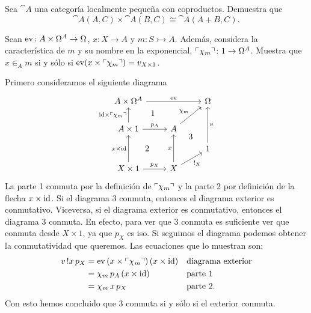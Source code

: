 \begin{exercise}[par=2]
  Sea \(\cat{A}\) una categoría localmente pequeña con coproductos. Demuestra que
  \begin{equation*}
    \cat{A}(A,C)\times\cat{A}(B,C)\cong\cat{A}(A+B,C).
  \end{equation*}
\end{exercise}

\begin{exercise}[par=2,teca=2]
  Sean \(\mathrm{ev}\colon A\times\Omega^A\to\Omega\), \(x\colon X\to A\) y 
  \(m\colon S\rightarrowtail A\). Además, considera la característica de \(m\) y
  su nombre en la exponencial, \(\ulcorner\chi_m\urcorner\colon 1\to\Omega^A\). Muestra que 
  \(x\in_A m\) si y sólo si \(\mathrm{ev}(x\times\ulcorner\chi_m\urcorner) = v_{X\times 1}\).
\end{exercise}
\begin{solution}[print=true]
  Primero consideramos el siguiente diagrama
  \begin{equation}\label{eq:diagrama}
    \begin{tikzcd}[ampersand replacement=\&]
      A\times\Omega^A\ar{rr}{\ev} \&\& \Omega\\
      A\times 1\ar{u}{\id\times\name{\chi_m}}[name=a]{}\ar{r}{p_A}
      \& A\ar{ru}[name=b]{\chi_m} \\[-2ex]
      \&\& 1\ar{uu}[swap,name=y]{v} \\[-2ex]
      X\times 1\ar{uu}{x\times\id}[name=xid]{}\ar{r}{p_X}
      \& X\ar{uu}[name=x]{x}\ar{ur}[swap]{!_X}
      \ar[phantom, from=a, to=b, "1"]
      \ar[phantom, from=xid, to=x, "2"]
      \ar[phantom, from=x, to=y, "3"]
    \end{tikzcd}
  \end{equation}
  La parte 1 conmuta por la definición de \(\ulcorner\chi_m\urcorner\) y la parte 2 por
  definición de la flecha \(x\times\mathrm{id}\). Si el diagrama 3 conmuta, entonces el
  diagrama exterior es conmutativo. Viceversa, si el diagrama exterior es
  conmutativo, entonces el diagrama 3 conmuta. En efecto, para ver que 3 conmuta
  es suficiente ver que conmuta desde \(X\times 1\), ya que \(p_X\) es iso. Si
  seguimos el diagrama podemos obtener la conmutatividad que queremos. Las
  ecuaciones que lo muestran son:
  \begin{align*}
    v\,!x\,p_X &= \mathrm{ev}\,(x\times\ulcorner\chi_m\urcorner)\,(x\times\mathrm{id})
    && \text{diagrama exterior}\\
    & = \chi_m\,p_A\,(x\times\mathrm{id}) && \text{parte 1}\\
    &= \chi_m\,x\,p_X && \text{parte 2.}
  \end{align*} 
  Con esto hemos concluido que 3 conmuta si y sólo si el exterior conmuta.


\end{solution}
